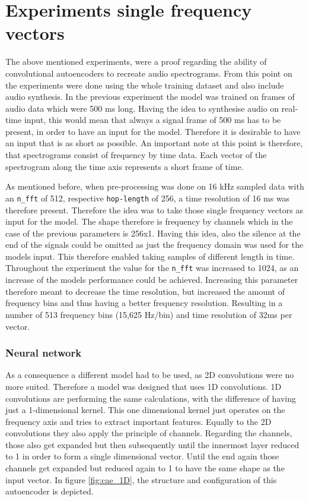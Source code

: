 \section{Experiments single frequency vectors}
The above mentioned experiments, were a proof regarding the ability of convolutional autoencoders to recreate audio spectrograms. From this point on the experiments were done using the whole training dataset and also include audio synthesis. In the previous experiment the model was trained on frames of audio data which were 500 ms long. Having the idea to synthesise audio on real-time input, this would mean that always a signal frame of 500 ms has to be present, in order to have an input for the model. Therefore it is desirable to have an input that is as short as possible. An important note at this point is therefore, that spectrograms consist of frequency by time data. Each vector of the spectrogram along the time axis represents a short frame of time. 

As mentioned before, when pre-processing was done on 16 kHz sampled data with an \texttt{n\_fft} of 512, respective \texttt{hop-length} of 256, a time resolution of 16 ms was therefore present. Therefore the idea was to take those single frequency vectors as input for the model. The shape therefore is frequency by channels which in the case of the previous parameters is 256x1. Having this idea, also the silence at the end of the signals could be omitted as just the frequency domain was used for the models input. This therefore enabled taking samples of different length in time. Throughout the experiment the value for the \texttt{n\_fft} was increased to 1024, as an increase of the models performance could be achieved. Increasing this parameter therefore meant to decrease the time resolution, but increased the amount of frequency bins and thus having a better frequency resolution. Resulting in a number of 513 frequency bins (15,625 Hz/bin) and time resolution of 32ms per vector.


\subsubsection{Neural network}
As a consequence a different model had to be used, as 2D convolutions were no more suited. Therefore a model was designed that uses 1D convolutions. 1D convolutions are performing the same calculations, with the difference of having just a 1-dimensional kernel. This one dimensional kernel just operates on the frequency axis and tries to extract important features. Equally to the 2D convolutions they also apply the principle of channels. Regarding the channels, those also get expanded but then subsequently until the innermost layer reduced to 1 in order to form a single dimensional vector. Until the end again those channels get expanded but reduced again to 1 to have the same shape as the input vector. In figure \ref{fig:cae_1D}, the structure and configuration of this autoencoder is depicted. 

